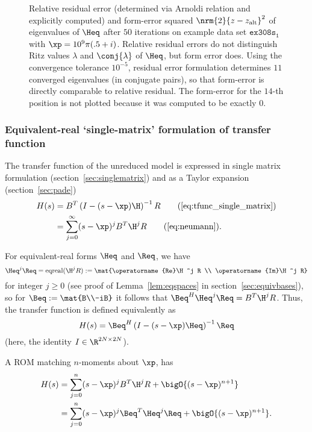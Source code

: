 \begin{figure}[htbp]
	\centering
	\caption{Relative residual error (determined via Arnoldi relation and explicitly computed)
	 and form-error squared $\nrm{2}{z-z_\textrm{alt}}^2$
	 of eigenvalues of $\Heq$ after $50$ iterations on example data set
	 $\mathtt{ex308s_1}$ with $\xp=10^9\pi(.5+i)$.
	 Relative residual errors do not distinguish Ritz values
	 $\lambda$ and $\conj{\lambda}$ of $\Heq$, but form error does. Using the convergence tolerance
	 $10^{-5}$, residual error formulation determines $11$ converged eigenvalues (in conjugate pairs),
	 so that form-error is directly comparable to relative residual.
	 The form-error for the $14$-th position is not plotted because it
	 was computed to be exactly $0$.
	}
	\label{fig:rrhess308s1w50}
\end{figure}

\subsubsection{Equivalent-real `single-matrix' formulation of transfer function }
The transfer function of the unreduced model is expressed in single matrix formulation
(section~\ref{sec:singlematrix}) and as a Taylor expansion (section~\ref{sec:pade})
\begin{align}
     H(s) &= B^T\left(I-(s-\xp)\H\right)^{-1}R \tag{\ref{eq:tfunc_single_matrix}}\\
     &= \sum_{j=0}^\infty (s-\xp )^jB^T\H^jR \tag{\ref{eq:neumann}}.
\end{align}

For equivalent-real forms $\Heq$ and $\Req$, we have
\[
	\Heq^j \Req = \textrm{eqreal}(\H^j R)
	:= \mat{\operatorname{Re}\H^j R \\ \operatorname{Im}\H^j R}
\]
for integer $j\geq 0$
(see proof of Lemma~\ref{lem:eqspaces} in section~\ref{sec:equivbases}),
so for $\Beq:=\mat{B\\-iB}$ it follows that $\Beq^H\Heq^j \Req = B^T\H^j R$.
Thus, the transfer function is defined equivalently as
\begin{equation}
     H(s) = \Beq^H\left(I-(s-\xp)\Heq\right)^{-1}\Req
   \label{eq:eq_real_tfunc_single_matrix}
\end{equation}
(here, the identity $I\in\R^{2N \times 2N}$).

A ROM  matching $n$-moments about $\xp$, has
\begin{align*}
   H(s) &= \sum_{j=0}^n (s-\xp )^jB^T\H^jR + \bigO{(s-\xp )^{n+1}}\\
   &= \sum_{j=0}^n (s-\xp )^j\Beq^T\Heq^j\Req + \bigO{(s-\xp )^{n+1}}.
\end{align*}
